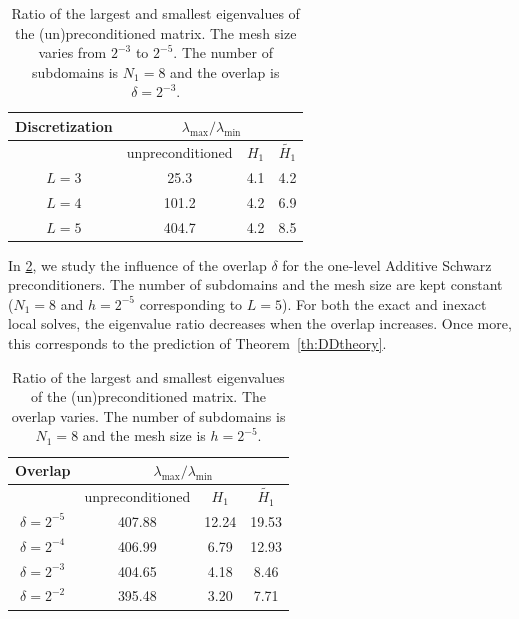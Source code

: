 \documentclass[onefignum,onetabnum]{siamart251216}
\newcommand{\Hone}{H_1}
\newcommand{\Honeap}{\widetilde{\Hone}}
\begin{document}
\begin{table}[htbp]
\caption{Ratio of the largest and smallest eigenvalues of the (un)preconditioned matrix. The mesh size varies from $2^{-3}$ to $2^{-5}$. The number of subdomains is $N_1=8$ and the overlap is $\delta=2^{-3}$.}\label{tab:classical_dd_discretization}
\begin{center}
\begin{tabular}{| c |c | c | c |}
 \hline
 Discretization & \multicolumn{3}{|c|}{${\lambda_{\max}}/{\lambda_{\min}}$} \\[0.5ex] \hline
 & unpreconditioned & $\Hone$ & $\Honeap$ \\ [0.5ex] \hline
$L=3$ & 25.3 & 4.1 & 4.2 \\ \hline
$L=4$ & 101.2 & 4.2 & 6.9 \\ \hline
$L=5$ & 404.7 & 4.2 & 8.5 \\\hline
\end{tabular}
\end{center}
\end{table}

In \cref{tab:classical_dd_delta}, we study the influence of the overlap $\delta$ for the one-level Additive Schwarz preconditioners. The number of subdomains and the mesh size are kept constant ($N_1=8$ and $h=2^{-5}$ corresponding to $L=5$). For both the exact and inexact local solves, the eigenvalue ratio decreases when the overlap increases. Once more, this corresponds to the prediction of Theorem~\ref{th:DDtheory}.

\begin{table}[htbp]
\caption{Ratio of the largest and smallest eigenvalues of the (un)preconditioned matrix. The overlap varies. The number of subdomains is $N_1=8$ and the mesh size is $h=2^{-5}$.}\label{tab:classical_dd_delta}
\begin{center}
\begin{tabular}{| c |c | c | c |}
 \hline
 Overlap & \multicolumn{3}{|c|}{${\lambda_{\max}}/{\lambda_{\min}}$} \\[0.5ex] \hline
 & unpreconditioned & $\Hone$ & $\Honeap$ \\ [0.5ex] \hline
$\delta=2^{-5}$ & 407.88 & 12.24 & 19.53 \\ \hline
$\delta=2^{-4} $ & 406.99 & 6.79 & 12.93 \\ \hline
$\delta=2^{-3}$ & 404.65 & 4.18 & 8.46 \\\hline
$\delta=2^{-2}$ & 395.48 & 3.20 & 7.71 \\\hline
\end{tabular}
\end{center}
\end{table}
\end{document}

